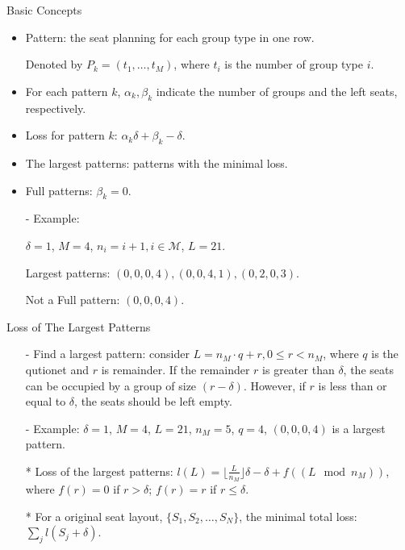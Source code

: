   \begin{frame}{Basic Concepts}
    \begin{itemize}
      \item Pattern: the seat planning for each group type in one row. 
      
      Denoted by $P_{k} = (t_1, \ldots, t_M)$, where $t_i$ is the number of group type $i$.
      \item For each pattern $k$, $\alpha_k, \beta_k$ indicate the number of groups and the left seats, respectively.
      \item Loss for pattern $k$: $\alpha_k \delta + \beta_k - \delta$.
      \item The largest patterns: patterns with the minimal loss. 
      \item Full patterns: $\beta_k =0$.
      \item[-] {\color{blue} Example}: 
      
      $\delta = 1$, $M =4$, $n_i = i+1, i \in \mathcal{M}$, $L = 21$.
      
      Largest patterns: $(0, 0, 0, 4), (0, 0, 4, 1), (0, 2, 0, 3)$.
      
      Not a Full pattern: $(0, 0, 0, 4)$.
    \end{itemize}
  \end{frame}


  \begin{frame}{Loss of The Largest Patterns}
    \begin{itemize}
      \item[-] Find a largest pattern: consider $L = n_{M} \cdot q + r, 0 \leq r < n_{M}$, where $q$ is the qutionet and $r$ is remainder. If the remainder $r$ is greater than $\delta$, the seats can be occupied by a group of size $(r-\delta)$. However, if $r$ is less than or equal to $\delta$, the seats should be left empty.
      \item[-] {\color{blue} Example}: $\delta =1$, $M =4$, $L=21$, $n_M = 5$, $q =4$, $(0,0,0,4)$ is a largest pattern.
      \item[*] Loss of the largest patterns: $l(L) = \lfloor \frac{L}{n_{M}} \rfloor \delta -\delta + f((L \mod n_{M}))$, where $f(r) =0$ if $r > \delta$; $f(r) = r$ if $r \leq \delta$.
      \item[*] For a original seat layout, $\{S_1, S_2, \ldots, S_{N}\}$, the minimal total loss: $\sum_{j} l(S_j + \delta)$.
    \end{itemize}
  \end{frame}
  
